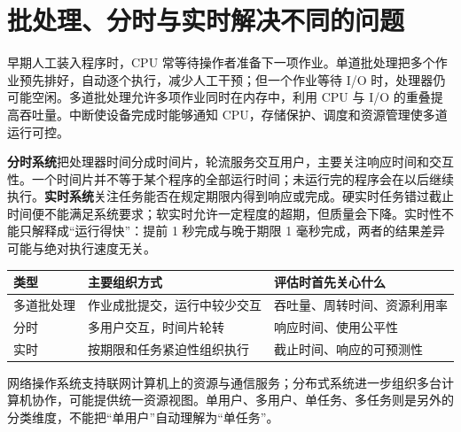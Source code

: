 \section{批处理、分时与实时解决不同的问题}\label{OS01-1-2}

早期人工装入程序时，CPU 常等待操作者准备下一项作业。单道批处理把多个作业预先排好，自动逐个执行，减少人工干预；但一个作业等待 I/O 时，处理器仍可能空闲。多道批处理允许多项作业同时在内存中，利用 CPU 与 I/O 的重叠提高吞吐量。中断使设备完成时能够通知 CPU，存储保护、调度和资源管理使多道运行可控。

\textbf{分时系统}把处理器时间分成时间片，轮流服务交互用户，主要关注响应时间和交互性。一个时间片并不等于某个程序的全部运行时间；未运行完的程序会在以后继续执行。\textbf{实时系统}关注任务能否在规定期限内得到响应或完成。硬实时任务错过截止时间便不能满足系统要求；软实时允许一定程度的超期，但质量会下降。实时性不能只解释成``运行得快''：提前 1 秒完成与晚于期限 1 毫秒完成，两者的结果差异可能与绝对执行速度无关。

\begin{wideblock}

\par\medskip\noindent\begin{minipage}{\linewidth}\fontsize{9.3}{12}\selectfont\begin{tabularx}{\linewidth}{@{}YYY@{}}
\toprule\noalign{}
\begin{minipage}[b]{\linewidth}\raggedright
类型
\end{minipage} & \begin{minipage}[b]{\linewidth}\raggedright
主要组织方式
\end{minipage} & \begin{minipage}[b]{\linewidth}\raggedright
评估时首先关心什么
\end{minipage} \\
\midrule\noalign{}


多道批处理 & 作业成批提交，运行中较少交互 & 吞吐量、周转时间、资源利用率 \\
分时 & 多用户交互，时间片轮转 & 响应时间、使用公平性 \\
实时 & 按期限和任务紧迫性组织执行 & 截止时间、响应的可预测性 \\
\bottomrule\end{tabularx}
\end{minipage}\par\medskip

\end{wideblock}

网络操作系统支持联网计算机上的资源与通信服务；分布式系统进一步组织多台计算机协作，可能提供统一资源视图。单用户、多用户、单任务、多任务则是另外的分类维度，不能把``单用户''自动理解为``单任务''。

